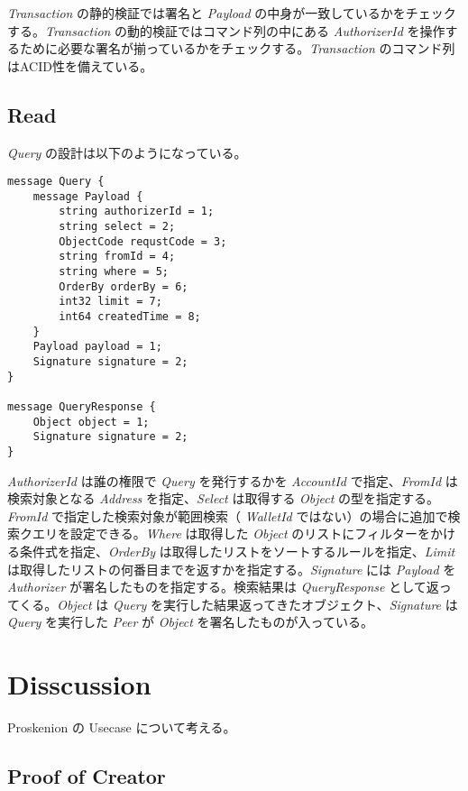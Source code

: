 \emph{Transaction} の静的検証では署名と \emph{Payload}
の中身が一致しているかをチェックする。\emph{Transaction}
の動的検証ではコマンド列の中にある \emph{AuthorizerId}
を操作するために必要な署名が揃っているかをチェックする。\emph{Transaction}
のコマンド列はACID性を備えている。

\hypertarget{read}{%
\subsection{Read}\label{read}}

\emph{Query} の設計は以下のようになっている。

\begin{verbatim}
message Query {
    message Payload {
        string authorizerId = 1;
        string select = 2;
        ObjectCode requstCode = 3;
        string fromId = 4;
        string where = 5;
        OrderBy orderBy = 6;
        int32 limit = 7;
        int64 createdTime = 8;
    }
    Payload payload = 1;
    Signature signature = 2;
}

message QueryResponse {
    Object object = 1;
    Signature signature = 2;
}
\end{verbatim}

\emph{AuthorizerId} は誰の権限で \emph{Query} を発行するかを
\emph{AccountId} で指定、\emph{FromId} は検索対象となる \emph{Address}
を指定、\emph{Select} は取得する \emph{Object}
の型を指定する。\emph{FromId} で指定した検索対象が範囲検索（
\emph{WalletId}
ではない）の場合に追加で検索クエリを設定できる。\emph{Where} は取得した
\emph{Object} のリストにフィルターをかける条件式を指定、\emph{OrderBy}
は取得したリストをソートするルールを指定、\emph{Limit}
は取得したリストの何番目までを返すかを指定する。\emph{Signature} には
\emph{Payload} を \emph{Authorizer} が署名したものを指定する。検索結果は
\emph{QueryResponse} として返ってくる。\emph{Object} は \emph{Query}
を実行した結果返ってきたオブジェクト、\emph{Signature} は \emph{Query}
を実行した \emph{Peer} が \emph{Object} を署名したものが入っている。

\hypertarget{disscussion}{%
\section{Disscussion}\label{disscussion}}

Proskenion の Usecase について考える。

\hypertarget{proof-of-creator}{%
\subsection{Proof of Creator}\label{proof-of-creator}}

